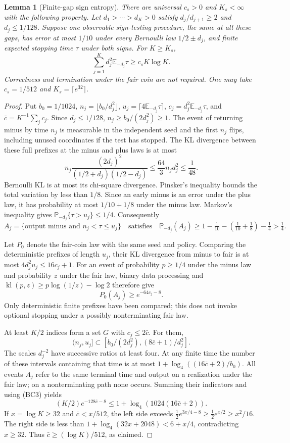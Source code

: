 \documentclass[11pt]{article}
\newtheorem{lemma}[theorem]{Lemma}
\begin{document}
\begin{lemma}[Finite-gap sign entropy]\label{lem:finite-sign-entropy}
There are universal $c_s>0$ and $K_s<\infty$ with the following property.
Let $d_1>\cdots>d_K>0$ satisfy $d_j/d_{j+1}\ge2$ and
$d_j\le1/128$. Suppose one observable sign-testing procedure, the same
at all these gaps, has error at most $1/10$ under every Bernoulli law
$1/2\pm d_j$, and finite expected stopping time $\tau$ under both signs.
For $K\ge K_s$,
\[
              \sum_{j=1}^K d_j^2\mathbb E_{-d_j}\tau
                   \ge c_s K\log K.                    \tag{BC2}
\]
Correctness and termination under the fair coin are not required.
One may take $c_s=1/512$ and $K_s=\lceil e^{32}\rceil$.
\end{lemma}
\begin{proof}
Put $b_0=1/1024$, $n_j=\lfloor b_0/d_j^2\rfloor$,
$u_j=\lceil4\mathbb E_{-d_j}\tau\rceil$,
$c_j=d_j^2\mathbb E_{-d_j}\tau$, and
$\bar c=K^{-1}\sum_jc_j$. Since $d_j\le1/128$,
$n_j\ge b_0/(2d_j^2)\ge1$. The event of returning minus by time $n_j$
is measurable in the independent seed and the first $n_j$ flips, including
unused coordinates if the test has stopped. The KL divergence between
these full prefixes at the minus and plus laws is at most
\[
 n_j\frac{(2d_j)^2}{(1/2+d_j)(1/2-d_j)}
 \le\frac{64}{3}n_jd_j^2\le\frac1{48}.
\]
Bernoulli KL is at most its chi-square divergence. Pinsker's inequality
bounds the total variation by less than $1/8$. Since an early minus is
an error under the plus law, it has probability at most $1/10+1/8$ under
the minus law. Markov's inequality gives
$\mathbb P_{-d_j}\{\tau>u_j\}\le1/4$. Consequently
\[
 A_j=\{\text{output minus and }n_j<\tau\le u_j\}
 \quad\text{satisfies}\quad
 \mathbb P_{-d_j}(A_j)
 \ge1-\tfrac1{10}-(\tfrac1{10}+\tfrac18)-\tfrac14>\tfrac14.
\]

Let $P_0$ denote the fair-coin law with the same seed and policy. Comparing
the deterministic prefixes of length $u_j$, their KL divergence from
minus to fair is at most
$4d_j^2u_j\le16c_j+1$. For an event of probability $p\ge1/4$ under
the minus law and probability $z$ under the fair law, binary data
processing and $\operatorname{kl}(p,z)\ge p\log(1/z)-\log2$ therefore give
\[
                     P_0(A_j)\ge e^{-64c_j-8}.          \tag{BC3}
\]
Only deterministic finite prefixes have been compared; this does not
invoke optional stopping under a possibly nonterminating fair law.

At least $K/2$ indices form a set $G$ with $c_j\le2\bar c$. For them,
\[
 (n_j,u_j]\subset
 [b_0/(2d_j^2),(8\bar c+1)/d_j^2].
\]
The scales $d_j^{-2}$ have successive ratios at least four. At any finite
time the number of these intervals containing that time is at most
$1+\log_4((16\bar c+2)/b_0)$. All events $A_j$ refer to the same terminal
time and output on a realization under the fair law; on a nonterminating
path none occurs. Summing their indicators and using (BC3) yields
\[
 (K/2)e^{-128\bar c-8}
        \le1+\log_4(1024(16\bar c+2)).                  \tag{BC4}
\]
If $x=\log K\ge32$ and $\bar c<x/512$, the left side exceeds
$\tfrac12e^{3x/4-8}\ge\tfrac12e^{x/2}\ge x^2/16$.
The right side is less than
$1+\log_4(32x+2048)<6+x/4$, contradicting $x\ge32$.
Thus $\bar c\ge(\log K)/512$, as claimed.
\end{proof}
\end{document}
